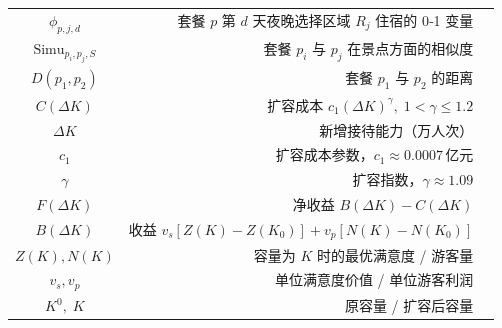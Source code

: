 \begin{table}[htbp]
\begin{tabularx}{\textwidth}{|C|D|U|}
    $\phi_{p,j,d}$ & 套餐 $p$ 第 $d$ 天夜晚选择区域 $R_j$ 住宿的 0‑1 变量 \\
    $\text{Simu}_{p_{i},p_{j},S}$ & 套餐 $p_i$ 与 $p_j$ 在景点方面的相似度 \\
    $D(p_1,p_2)$ & 套餐 $p_1$ 与 $p_2$ 的距离 \\
    $C(\Delta K)$ & 扩容成本 $c_1(\Delta K)^{\gamma},\;1<\gamma\le1.2$ \\
    $\Delta K$ & 新增接待能力（万人次） \\
    $c_1$ & 扩容成本参数，$c_1 \approx 0.0007$ 亿元 \\
    $\gamma$ & 扩容指数，$\gamma \approx 1.09$ \\
    $F(\Delta K)$ & 净收益 $B(\Delta K)-C(\Delta K)$ \\
    $B(\Delta K)$ & 收益 $v_s[Z(K)-Z(K_0)] + v_p[N(K)-N(K_0)]$ \\
    $Z(K), N(K)$ & 容量为 $K$ 时的最优满意度 / 游客量 \\
    $v_s, v_p$ & 单位满意度价值 / 单位游客利润 \\
    $K^0,\;K$ & 原容量 / 扩容后容量 \\
    \hline
  \end{tabularx}
\end{table}


